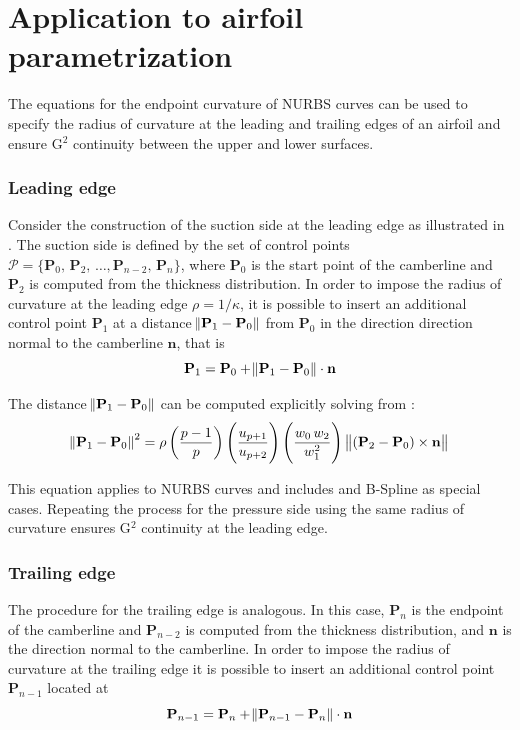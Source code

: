 \section{Application to airfoil parametrization}

The equations for the endpoint curvature of NURBS curves can be used to specify the radius of curvature at the leading and trailing edges of an airfoil and ensure G$^2$ continuity between the upper and lower surfaces.

\subsubsection*{Leading edge}
Consider the construction of the suction side at the leading edge as illustrated in . The suction side is defined by the set of control points $\mathcal{P} = \{ \mathbf{P}_{0},\, \mathbf{P}_{2},\, \dots, \mathbf{P}_{n-2},\, \mathbf{P}_{n} \}$,
where $\mathbf{P}_{0}$ is the start point of the camberline and $\mathbf{P}_{2}$ is computed from the thickness distribution.
In order to impose the radius of curvature at the leading edge $\rho = 1/\kappa$, it is possible to insert an additional control point $\mathbf{P}_{1}$ at a distance $\norm{\mathbf{P}_{1}-\mathbf{P}_{0}}$ from $\mathbf{P}_{0}$ in the direction direction normal to the camberline $\mathbf{n}$, that is
\begin{equation}
    \mathbf{P}_{1} = \mathbf{P}_{0} +  \norm{\mathbf{P}_{1}-\mathbf{P}_{0}} \cdot \mathbf{n}
\end{equation}

The distance $\norm{\mathbf{P}_{1}-\mathbf{P}_{0}}$ can be computed explicitly solving from :
\begin{equation}
      \norm{\mathbf{P}_{1}-\mathbf{P}_{0}}^{2} = \rho  \left( \frac{p-1}{p}  \right) \left( \frac{u_{p+1}}{u_{p+2}}  \right) \left(\frac{w_{0}\,w_{2}}{w_{1}^2} \right) \, \norm{ (\mathbf{P}_{2}-\mathbf{P}_{0}) \times \mathbf{n}}
\end{equation}

This equation applies to NURBS curves and includes \Bezier and B-Spline as special cases. Repeating the process for the pressure side using the same radius of curvature ensures G$^2$ continuity at the leading edge.



\subsubsection*{Trailing edge}
The procedure for the trailing edge is analogous. In this case, $\mathbf{P}_{n}$ is the endpoint of the camberline and $\mathbf{P}_{n-2}$ is computed from the thickness distribution, and $\mathbf{n}$ is the direction normal to the camberline.
In order to impose the radius of curvature at the trailing edge it is possible to insert an additional control point $\mathbf{P}_{n-1}$ located at
\begin{equation}
    \mathbf{P}_{n-1} = \mathbf{P}_{n} +  \norm{\mathbf{P}_{n-1}-\mathbf{P}_{n}} \cdot \mathbf{n}
\end{equation}

